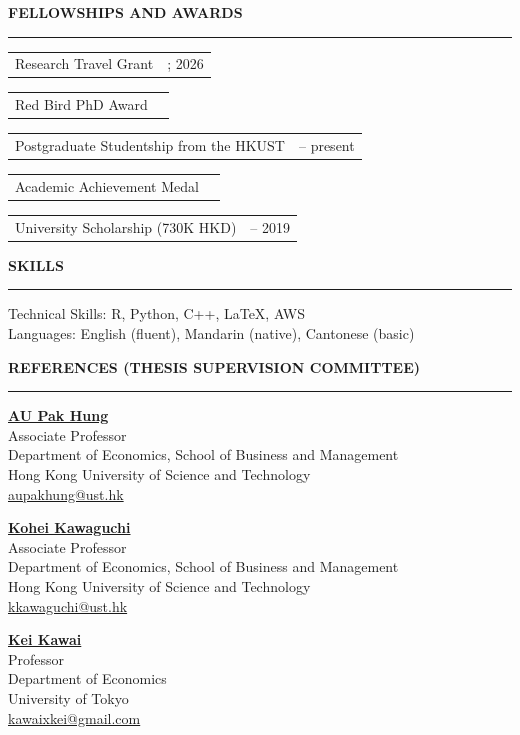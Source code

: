 \documentclass[11pt,letterpaper]{article}
\makeatletter
\newlength{\cvdatecol}
\newcommand{\sectionheader}[1]{%
  \vspace{0.55em}
  {\large\bfseries #1}\\[-0.15em]
  \rule{\textwidth}{0.4pt}\par
  \vspace{0.25em}
}
\newcommand{\cvline}[3][0em]{%
  \par\nobreak
  \noindent\hspace*{#1}%
  \begin{tabularx}{\dimexpr\textwidth-#1\relax}{@{}X@{\hspace{0.75em}}>{\raggedleft\arraybackslash}p{\cvdatecol}@{}}
  #2 & #3 \\
  \end{tabularx}%
}
\makeatother
\begin{document}
\sectionheader{FELLOWSHIPS AND AWARDS}
{
\cvline[1.5em]{Research Travel Grant}{2023; 2026}
\vspace{-0.12em}
\cvline[1.5em]{Red Bird PhD Award}{2022}
\vspace{-0.12em}
\cvline[1.5em]{Postgraduate Studentship from the HKUST}{2020 -- present}
\vspace{-0.12em}
\cvline[1.5em]{Academic Achievement Medal}{2019}
\vspace{-0.12em}
\cvline[1.5em]{University Scholarship (730K HKD)}{2015 -- 2019}
}

\sectionheader{SKILLS}
Technical Skills: R, Python, C++, \LaTeX, AWS\\
Languages: English (fluent), Mandarin (native), Cantonese (basic)

\sectionheader{REFERENCES (THESIS SUPERVISION COMMITTEE)}
{
\noindent
\begin{minipage}[t]{0.48\textwidth}
\textbf{\href{https://aupakhung.weebly.com/}{AU Pak Hung}}\\
Associate Professor\\
Department of Economics, School of Business and Management\\
Hong Kong University of Science and Technology\\
\href{mailto:aupakhung@ust.hk}{aupakhung@ust.hk}
\end{minipage}\hfill
\begin{minipage}[t]{0.48\textwidth}
\textbf{\href{https://www.kohei-kawaguchi.com/}{Kohei Kawaguchi}}\\
Associate Professor\\
Department of Economics, School of Business and Management\\
Hong Kong University of Science and Technology\\
\href{mailto:kkawaguchi@ust.hk}{kkawaguchi@ust.hk}
\end{minipage}

\vspace{1.0em}
\noindent
\begin{minipage}[t]{0.48\textwidth}
\textbf{\href{https://www.e.u-tokyo.ac.jp/fservice/faculty/kawai/kawai-e/kawai01-e.html}{Kei Kawai}}\\
Professor\\
Department of Economics\\
University of Tokyo\\
\href{mailto:kawaixkei@gmail.com}{kawaixkei@gmail.com}
\end{minipage}
}
\end{document}
